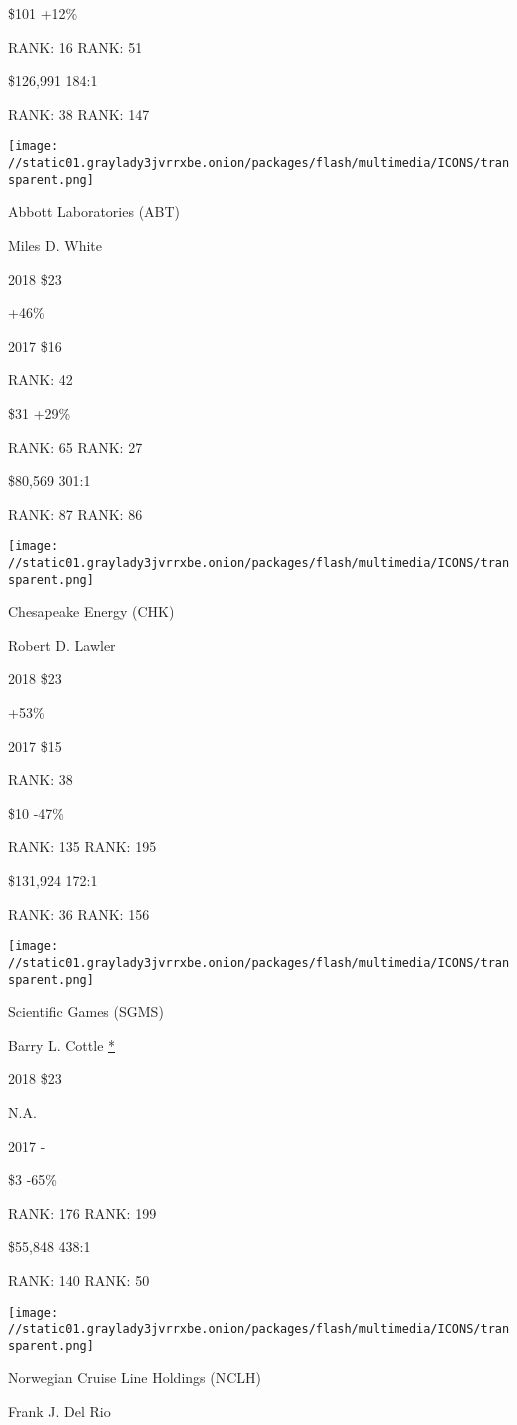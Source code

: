  \$101 +12\%

RANK: 16 RANK: 51

 \$126,991 184:1

RANK: 38 RANK: 147

\texttt{[image: //static01.graylady3jvrrxbe.onion/packages/flash/multimedia/ICONS/transparent.png]}

Abbott Laboratories (ABT)

Miles D. White \protect\hyperlink{g-footnotes}{}

2018 \$23

 +46\%

2017 \$16

RANK: 42

 \$31 +29\%

RANK: 65 RANK: 27

 \$80,569 301:1

RANK: 87 RANK: 86

\texttt{[image: //static01.graylady3jvrrxbe.onion/packages/flash/multimedia/ICONS/transparent.png]}

Chesapeake Energy (CHK)

Robert D. Lawler \protect\hyperlink{g-footnotes}{}

2018 \$23

 +53\%

2017 \$15

RANK: 38

 \$10 -47\%

RANK: 135 RANK: 195

 \$131,924 172:1

RANK: 36 RANK: 156

\texttt{[image: //static01.graylady3jvrrxbe.onion/packages/flash/multimedia/ICONS/transparent.png]}

Scientific Games (SGMS)

Barry L. Cottle \protect\hyperlink{g-footnotes}{*}

2018 \$23

 N.A.

2017 -

 \$3 -65\%

RANK: 176 RANK: 199

 \$55,848 438:1

RANK: 140 RANK: 50

\texttt{[image: //static01.graylady3jvrrxbe.onion/packages/flash/multimedia/ICONS/transparent.png]}

Norwegian Cruise Line Holdings (NCLH)

Frank J. Del Rio \protect\hyperlink{g-footnotes}{}

